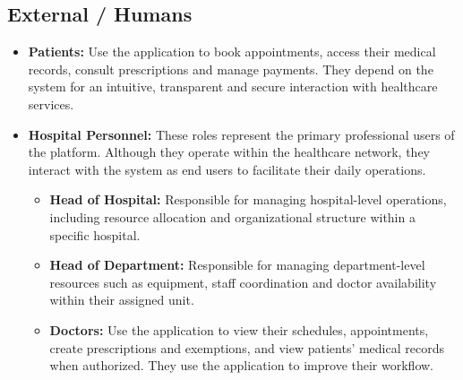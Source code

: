 \documentclass[12pt, a4paper]{article}
\begin{document}
\subsection{External / Humans}
\begin{itemize}
    \item \textbf{Patients:} Use the application to book appointments, access their medical records, consult prescriptions and manage payments. They depend on the system for an intuitive, transparent and secure interaction with healthcare services.


     \item \textbf{Hospital Personnel:} 
    These roles represent the primary professional users of the platform. Although they operate within the healthcare network, they interact with the system as end users to facilitate their daily operations.
    \begin{itemize} 
        \item \textbf{Head of Hospital:} Responsible for managing hospital-level operations, including resource allocation and organizational structure within a specific hospital.
    
        \item \textbf{Head of Department:} Responsible for managing department-level resources such as equipment, staff coordination and doctor availability within their assigned unit.
    
        \item \textbf{Doctors:} Use the application to view their schedules, appointments, create prescriptions and exemptions, and view patients' medical records when authorized. They use the application to improve their workflow.
    \end{itemize}
\end{itemize}
\end{document}
